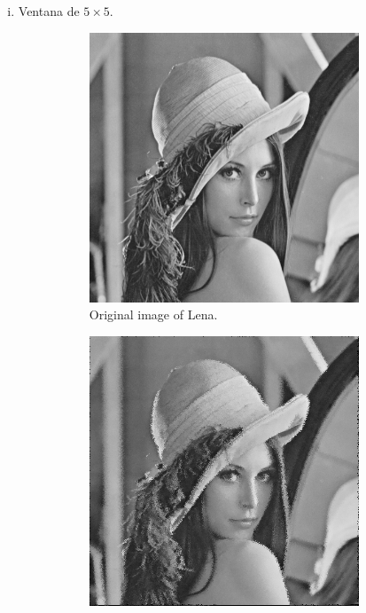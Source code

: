 \documentclass{article}
\theoremstyle{problemstyle}
\begin{document}
\begin{problem}
\begin{enumerate}[a)]
\begin{enumerate}[i)]
		      \item Ventana de $ 5\times 5 $.
		            \begin{figure}[H]
			            \begin{subfigure}{.45\textwidth}
				            \centering
				            \includegraphics[width=0.95\textwidth]{lena_ascii.png}
				            \caption{Original image of Lena.}
			            \end{subfigure}
			            \hfill
			            \begin{subfigure}{.45\textwidth}
				            \centering
				            \includegraphics[width=0.95\textwidth]{lena_median_5x5.png}

\end{subfigure}
\end{figure}
\end{enumerate}
\end{enumerate}
\end{problem}
\end{document}
